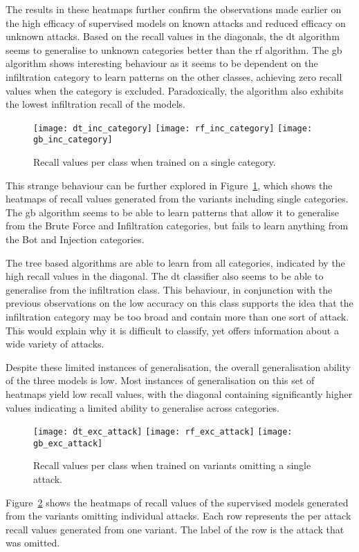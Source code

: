 The results in these heatmaps further confirm the observations made earlier on
the high efficacy of supervised models on known attacks and reduced efficacy on
unknown attacks. Based on the recall values in the diagonals, the \gls{dt}
algorithm seems to generalise to unknown categories better than the \gls{rf}
algorithm. The \gls{gb} algorithm shows interesting behaviour as it seems to be
dependent on the infiltration category to learn patterns on the other classes,
achieving zero recall values when the category is excluded. Paradoxically, the
algorithm also exhibits the lowest infiltration recall of the models.
%
\begin{figure}[htbp]
    \centering
    \texttt{[image: dt\_inc\_category]}
    \texttt{[image: rf\_inc\_category]}
    \texttt{[image: gb\_inc\_category]}
    \caption[Single Category Results]{Recall values per class when trained on a single category.\label{fig:inc_cat}}
\end{figure}
% 
This strange behaviour can be further explored in Figure~\ref{fig:inc_cat},
which shows the heatmaps of recall values generated from the variants including
single categories. The \gls{gb} algorithm seems to be able to learn patterns
that allow it to generalise from the Brute Force and Infiltration categories,
but fails to learn anything from the Bot and Injection categories.

The tree based algorithms are able to learn from all categories, indicated by
the high recall values in the diagonal. The \gls{dt} classifier also seems to
be able to generalise from the infiltration class. This behaviour, in
conjunction with the previous observations on the low accuracy on this class
supports the idea that the infiltration category may be too broad and contain
more than one sort of attack. This would explain why it is difficult to
classify, yet offers information about a wide variety of attacks.

Despite these limited instances of generalisation, the overall generalisation
ability of the three models is low. Most instances of generalisation on this
set of heatmaps yield low recall values, with the diagonal containing
significantly higher values indicating a limited ability to generalise across
categories.
%
\begin{figure}[htbp]
    \centering
    \texttt{[image: dt\_exc\_attack]}
    \texttt{[image: rf\_exc\_attack]}
    \texttt{[image: gb\_exc\_attack]}
    \caption[Individual Attack Omission Results.]{Recall values per class when trained on variants omitting a single attack.\label{fig:exc_att}}
\end{figure}
%
Figure~\ref{fig:exc_att} shows the heatmaps of recall values of the supervised
models generated from the variants omitting individual attacks. Each row
represents the per attack recall values generated from one variant. The label
of the row is the attack that was omitted.

